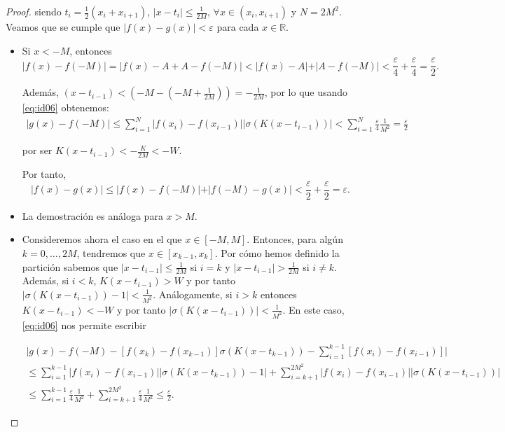 \begin{proof}
siendo $t_{i} = \frac{1}{2}(x_{i}+x_{i+1})$, $\vert x - t_{i} \vert \leq \frac{1}{2M}$, $\forall x \in (x_{i},x_{i+1})$ y $N=2M^{2}$. Veamos que  se cumple que $\vert f(x)-g(x)\vert < \varepsilon$ para cada $x\in \mathds{R}$. 
\begin{itemize}


\item Si $x<-M$, entonces $$\vert f(x)-f(-M)\vert = \vert f(x)-A + A -f(-M)\vert < \vert f(x)-A\vert + \vert A -f(-M)\vert < \frac{\varepsilon}{4} + \frac{\varepsilon}{4} = \frac{\varepsilon}{2}.$$

Además, $(x-t_{i-1}) < (-M -(-M + \frac{1}{2M})) = -\frac{1}{2M}$, por lo que usando \eqref{eq:id06} obtenemos:  
\begin{gather}
\vert g(x) - f(-M) \vert \leq \sum_{i=1}^{N} \vert f(x_{i})-f(x_{i-1})\vert \vert \sigma(K(x-t_{i-1}))\vert  <  \sum_{i=1}^{N}\frac{\varepsilon}{4}\frac{1}{M^{2}} = \frac{\varepsilon}{2}
\end{gather} 

por ser $K(x-t_{i-1})<-\frac{K}{2M}<-W$.  

Por tanto, 
$$\vert f(x) - g(x)\vert \leq \vert f(x) - f(-M)\vert + \vert f(-M) - g(x)\vert <  \frac{\varepsilon}{2} + \frac{\varepsilon}{2} = \varepsilon.$$  

\item La demostración es análoga para $x>M$.
 
\item Consideremos ahora el caso en el que $x\in [-M,M]$. Entonces, para algún $k=0, \ldots, 2M$, tendremos que $ x\in [x_{k-1},x_{k}]$. Por cómo hemos definido la partición sabemos que $ \vert x - t_{i-1} \vert \leq \frac{1}{2M}$ 
si $i=k$ y $\vert x - t_{i-1}\vert > \frac{1}{2M}$ si $i\neq k$. Además, si $i<k$, $K(x-t_{i-1})>W$   y por tanto
 $\vert \sigma(K(x-t_{i-1}))-1\vert<\frac{1}{M^{2}}$. Análogamente, si $i>k$ entonces
  $K(x-t_{i-1})<-W$ y por tanto $\vert \sigma (K(x-t_{i-1})
  )\vert < \frac{1}{M^{2}}$. En este caso, \eqref{eq:id06} nos permite escribir
  
\begin{gather}
\vert g(x) - f(-M) - [f(x_{k})-f(x_{k-1})]\sigma(K(x-t_{k-1})) -  \sum_{i=1}^{k-1} [ f(x_{i})-f(x_{i-1})]\vert  \\ \leq
\sum_{i=1}^{k-1} \vert f(x_{i})-f(x_{i-1})\vert \vert \sigma(K(x-t_{k-1})) - 1 \vert + \sum_{i=k+1}^{2M^{2}} \vert f(x_{i})-f(x_{i-1})\vert \vert \sigma(K(x-t_{i-1})) \vert  \\
 \leq \sum_{i=1}^{k-1} \frac{\varepsilon}{4}\frac{1}{M^{2}} + \sum_{i=k+1}^{2M^{2}} \frac{\varepsilon}{4}\frac{1}{M^{2}} \leq \frac{\varepsilon}{2}.
\end{gather} 


\end{itemize}
\end{proof}
